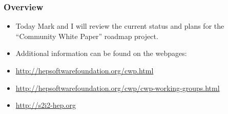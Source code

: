 \begin{frame}
\frametitle{Overview}

\begin{itemize}
\item Today Mark and I will review the current status and plans for the ``Community White Paper'' roadmap project.
\item Additional information can be found on the webpages:
\item \url{http://hepsoftwarefoundation.org/cwp.html}
\item \url{http://hepsoftwarefoundation.org/cwp/cwp-working-groups.html}
\item \url{http://s2i2-hep.org}
\end{itemize}

\end{frame}



